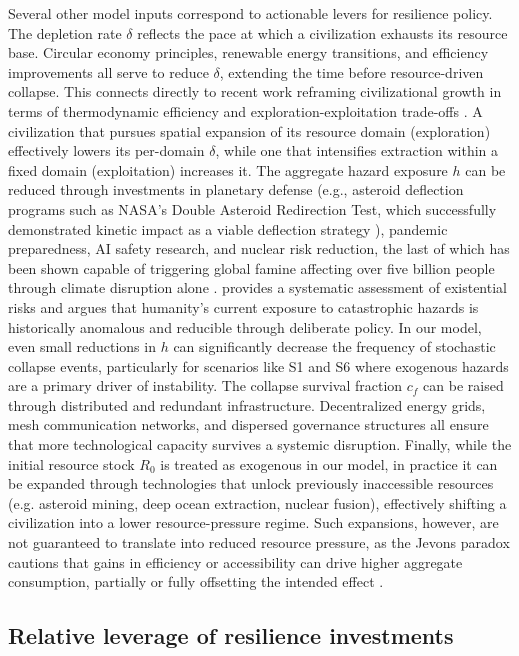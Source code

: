Several other model inputs correspond to actionable levers for resilience policy. The depletion rate $\delta$ reflects the pace at which a civilization exhausts its resource base. Circular economy principles, renewable energy transitions, and efficiency improvements all serve to reduce $\delta$, extending the time before resource-driven collapse. This connects directly to recent work reframing civilizational growth in terms of thermodynamic efficiency and exploration-exploitation trade-offs \citep{Haqq-Misra2025-lum}. A civilization that pursues spatial expansion of its resource domain (exploration) effectively lowers its per-domain $\delta$, while one that intensifies extraction within a fixed domain (exploitation) increases it. The aggregate hazard exposure $h$ can be reduced through investments in planetary defense (e.g., asteroid deflection programs such as NASA's Double Asteroid Redirection Test, which successfully demonstrated kinetic impact as a viable deflection strategy \citep{Daly2023-dart}), pandemic preparedness, AI safety research, and nuclear risk reduction, the last of which has been shown capable of triggering global famine affecting over five billion people through climate disruption alone \citep{Xia2022-nw}. \citet{Ord2020-tp} provides a systematic assessment of existential risks and argues that humanity's current exposure to catastrophic hazards is historically anomalous and reducible through deliberate policy. In our model, even small reductions in $h$ can significantly decrease the frequency of stochastic collapse events, particularly for scenarios like S1 and S6 where exogenous hazards are a primary driver of instability. The collapse survival fraction $c_f$ can be raised through distributed and redundant infrastructure. Decentralized energy grids, mesh communication networks, and dispersed governance structures all ensure that more technological capacity survives a systemic disruption. Finally, while the initial resource stock $R_0$ is treated as exogenous in our model, in practice it can be expanded through technologies that unlock previously inaccessible resources (e.g. asteroid mining, deep ocean extraction, nuclear fusion), effectively shifting a civilization into a lower resource-pressure regime. Such expansions, however, are not guaranteed to translate into reduced resource pressure, as the Jevons paradox cautions that gains in efficiency or accessibility can drive higher aggregate consumption, partially or fully offsetting the intended effect \citep{Jevons1865-cq}.

\subsection{\texorpdfstring{Relative leverage of resilience investments}{Relative leverage of resilience investments}}

